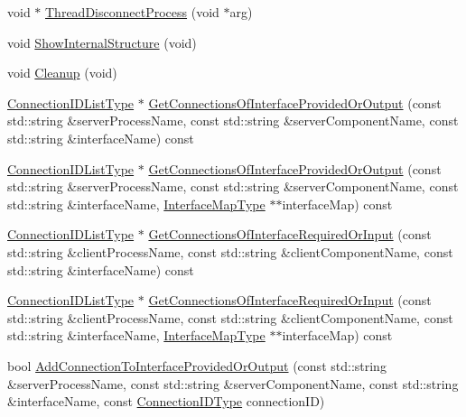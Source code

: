 \begin{DoxyCompactItemize}
\item 
void $\ast$ \hyperlink{classmts_manager_global_a0f668467bf640bdae65ec86dea9d01b8}{Thread\-Disconnect\-Process} (void $\ast$arg)
\item 
void \hyperlink{classmts_manager_global_af027272981d69071395d21a3e0634418}{Show\-Internal\-Structure} (void)
\item 
void \hyperlink{classmts_manager_global_a2f527606d2fe5b67bbe7d7323f562e20}{Cleanup} (void)
\item 
\hyperlink{classmts_manager_global_a01bcfffc97f320cdd87425bd4bd5bbad}{Connection\-I\-D\-List\-Type} $\ast$ \hyperlink{classmts_manager_global_a2ddfed4e74f4dd60bd7994825604b2dd}{Get\-Connections\-Of\-Interface\-Provided\-Or\-Output} (const std\-::string \&server\-Process\-Name, const std\-::string \&server\-Component\-Name, const std\-::string \&interface\-Name) const 
\item 
\hyperlink{classmts_manager_global_a01bcfffc97f320cdd87425bd4bd5bbad}{Connection\-I\-D\-List\-Type} $\ast$ \hyperlink{classmts_manager_global_acdcea160cd8e70e14c692442b4b16849}{Get\-Connections\-Of\-Interface\-Provided\-Or\-Output} (const std\-::string \&server\-Process\-Name, const std\-::string \&server\-Component\-Name, const std\-::string \&interface\-Name, \hyperlink{structmts_manager_global_1_1_interface_map_type}{Interface\-Map\-Type} $\ast$$\ast$interface\-Map) const 
\item 
\hyperlink{classmts_manager_global_a01bcfffc97f320cdd87425bd4bd5bbad}{Connection\-I\-D\-List\-Type} $\ast$ \hyperlink{classmts_manager_global_a5d4b54accc2a9c1e98440966690ef85f}{Get\-Connections\-Of\-Interface\-Required\-Or\-Input} (const std\-::string \&client\-Process\-Name, const std\-::string \&client\-Component\-Name, const std\-::string \&interface\-Name) const 
\item 
\hyperlink{classmts_manager_global_a01bcfffc97f320cdd87425bd4bd5bbad}{Connection\-I\-D\-List\-Type} $\ast$ \hyperlink{classmts_manager_global_a1e0b2e1ca58062ee8993cccd0ade1cb9}{Get\-Connections\-Of\-Interface\-Required\-Or\-Input} (const std\-::string \&client\-Process\-Name, const std\-::string \&client\-Component\-Name, const std\-::string \&interface\-Name, \hyperlink{structmts_manager_global_1_1_interface_map_type}{Interface\-Map\-Type} $\ast$$\ast$interface\-Map) const 
\item 
bool \hyperlink{classmts_manager_global_ababac733270efb19c7aaecbe2334c96a}{Add\-Connection\-To\-Interface\-Provided\-Or\-Output} (const std\-::string \&server\-Process\-Name, const std\-::string \&server\-Component\-Name, const std\-::string \&interface\-Name, const \hyperlink{mts_forward_declarations_8h_ad3543bb11742e1766374ec96016d6547}{Connection\-I\-D\-Type} connection\-I\-D)

\end{DoxyCompactItemize}

